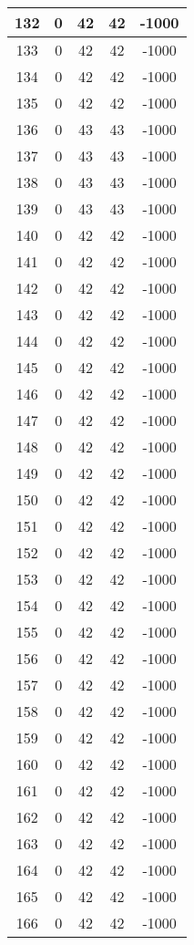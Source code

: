 \documentclass[letterpaper, 12pt]{article}
\begin{document}
\begin{longtable}{|c|c|c|c|c|}
\hline
132 & 0 & 42 & 42 & -1000 \\
\hline
133 & 0 & 42 & 42 & -1000 \\
\hline
134 & 0 & 42 & 42 & -1000 \\
\hline
135 & 0 & 42 & 42 & -1000 \\
\hline
136 & 0 & 43 & 43 & -1000 \\
\hline
137 & 0 & 43 & 43 & -1000 \\
\hline
138 & 0 & 43 & 43 & -1000 \\
\hline
139 & 0 & 43 & 43 & -1000 \\
\hline
140 & 0 & 42 & 42 & -1000 \\
\hline
141 & 0 & 42 & 42 & -1000 \\
\hline
142 & 0 & 42 & 42 & -1000 \\
\hline
143 & 0 & 42 & 42 & -1000 \\
\hline
144 & 0 & 42 & 42 & -1000 \\
\hline
145 & 0 & 42 & 42 & -1000 \\
\hline
146 & 0 & 42 & 42 & -1000 \\
\hline
147 & 0 & 42 & 42 & -1000 \\
\hline
148 & 0 & 42 & 42 & -1000 \\
\hline
149 & 0 & 42 & 42 & -1000 \\
\hline
150 & 0 & 42 & 42 & -1000 \\
\hline
151 & 0 & 42 & 42 & -1000 \\
\hline
152 & 0 & 42 & 42 & -1000 \\
\hline
153 & 0 & 42 & 42 & -1000 \\
\hline
154 & 0 & 42 & 42 & -1000 \\
\hline
155 & 0 & 42 & 42 & -1000 \\
\hline
156 & 0 & 42 & 42 & -1000 \\
\hline
157 & 0 & 42 & 42 & -1000 \\
\hline
158 & 0 & 42 & 42 & -1000 \\
\hline
159 & 0 & 42 & 42 & -1000 \\
\hline
160 & 0 & 42 & 42 & -1000 \\
\hline
161 & 0 & 42 & 42 & -1000 \\
\hline
162 & 0 & 42 & 42 & -1000 \\
\hline
163 & 0 & 42 & 42 & -1000 \\
\hline
164 & 0 & 42 & 42 & -1000 \\
\hline
165 & 0 & 42 & 42 & -1000 \\
\hline
166 & 0 & 42 & 42 & -1000 \\

\end{longtable}
\end{document}
